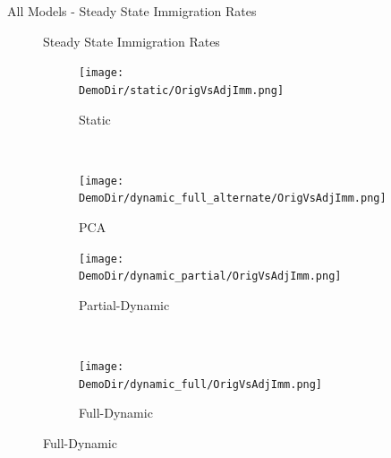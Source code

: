 \documentclass[12pt]{beamer}
\newcommand*{\DemoDir}{../code/Rick/OUTPUT/Demographics}
\begin{document}
\begin{frame}{All Models - Steady State Immigration Rates}

	\begin{figure}[H]
		Steady State Immigration Rates
		\begin{subfigure}{0.5\textwidth}
			\centering
			\texttt{[image: \\DemoDir/static/OrigVsAdjImm.png]}
			\vspace{-5mm}
			\caption{Static}
		\end{subfigure}%
		~ %
		\begin{subfigure}{0.5\textwidth}
			\centering
			\texttt{[image: \\DemoDir/dynamic\_full\_alternate/OrigVsAdjImm.png]}
			\vspace{-5mm}
			\caption{PCA}
		\end{subfigure}%
		\newline
		\begin{subfigure}{0.5\textwidth}
			\centering
			\texttt{[image: \\DemoDir/dynamic\_partial/OrigVsAdjImm.png]}
			\vspace{-5mm}
			\caption{Partial-Dynamic}
		\end{subfigure}%
		~ %
		\begin{subfigure}{0.5\textwidth}
			\centering
			\texttt{[image: \\DemoDir/dynamic\_full/OrigVsAdjImm.png]}
			\vspace{-5mm}
			\caption{Full-Dynamic}
		\end{subfigure}%
	\end{figure}

\end{frame}
\end{document}
